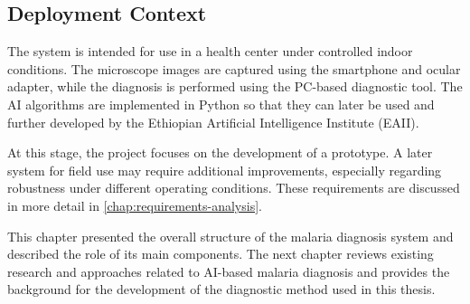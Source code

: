 \subsection{Deployment Context}

The system is intended for use in a health center under controlled indoor conditions. The microscope images are captured using the smartphone and ocular adapter, while the diagnosis is performed using the PC-based diagnostic tool. The AI algorithms are implemented in Python so that they can later be used and further developed by the Ethiopian Artificial Intelligence Institute (EAII).

At this stage, the project focuses on the development of a prototype. A later system for field use may require additional improvements, especially regarding robustness under different operating conditions. These requirements are discussed in more detail in \cref{chap:requirements-analysis}.

This chapter presented the overall structure of the malaria diagnosis system and described the role of its main components. The next chapter reviews existing research and approaches related to AI-based malaria diagnosis and provides the background for the development of the diagnostic method used in this thesis.